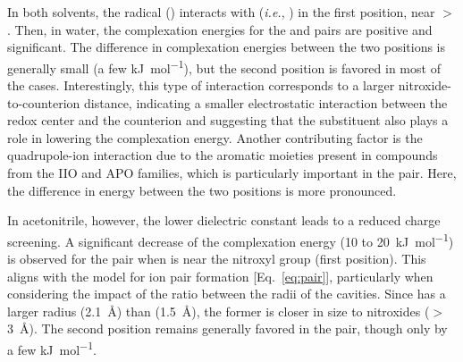 \documentclass[review,preprint]{elsarticle}
\begin{document}
In both solvents, the radical () interacts with  (\textit{i.e.}, ) in the first position, near  $>$ \cite{zhangEffectHeteroatomFunctionality2018}. Then, in water, the complexation energies for the  and  pairs are positive and significant. The difference in complexation energies between the two positions is generally small (a few \si{\kilo\joule\per\mole}), but the second position is favored in most of the cases. Interestingly, this type of interaction corresponds to a larger nitroxide-to-counterion distance, indicating a smaller electrostatic interaction between the redox center and the counterion and suggesting that the substituent also plays a role in lowering the complexation energy. Another contributing factor is the quadrupole-ion interaction due to the aromatic moieties present in compounds from the IIO and APO families, which is particularly important in the  pair. Here, the difference in energy between the two positions is more pronounced.

In acetonitrile, however, the lower dielectric constant leads to a reduced charge screening. A significant decrease of the complexation energy (10 to \SI{20}{\kilo\joule\per\mole}) is observed for the  pair when  is near the nitroxyl group (first position). This aligns with the model for ion pair formation [Eq.~\eqref{eq:pair}], particularly when considering the impact of the ratio between the radii of the cavities. Since  has a larger radius (\SI{2.1}{\angstrom}) than  (\SI{1.5}{\angstrom}), the former is closer in size to nitroxides ($>$\SI{3}{\angstrom}). The second position remains generally favored in the  pair, though only by a few \si{\kilo\joule\per\mole}.
\end{document}
